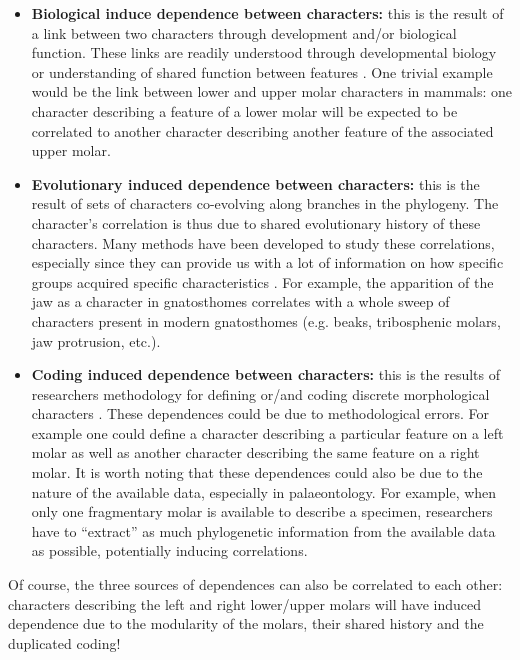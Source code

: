 \documentclass[12pt,letterpaper]{article}
\begin{document}
\begin{itemize}
    \item \textbf{Biological induce dependence between characters:} this is the result of a link between two characters through development and/or biological function.
    These links are readily understood through developmental biology or understanding of shared function between features \citep{goswami2006morphological,goswami2010,goswami2014macroevolutionary}.
    One trivial example would be the link between lower and upper molar characters in mammals: one character describing a feature of a lower molar will be expected to be correlated to another character describing another feature of the associated upper molar.

    \item \textbf{Evolutionary induced dependence between characters:} this is the result of sets of characters co-evolving along branches in the phylogeny.
    The character's correlation is thus due to shared evolutionary history of these characters.
    Many methods have been developed to study these correlations, especially since they can provide us with a lot of information on how specific groups acquired specific characteristics \citep{Lande1983,Maddison1990,Pagel1994,Pagel2006,Grabowski2016}.
    For example, the apparition of the jaw as a character in gnatosthomes correlates with a whole sweep of characters present in modern gnatosthomes (e.g. beaks, tribosphenic molars, jaw protrusion, etc.). %

    \item \textbf{Coding induced dependence between characters:} this is the results of researchers methodology for defining or/and coding discrete morphological characters \citep{Brazeau2011,simoes2017giant}.
    These dependences could be due to methodological errors. 
    For example one could define a character describing a particular feature on a left molar as well as another character describing the same feature on a right molar.
    It is worth noting that these dependences could also be due to the nature of the available data, especially in palaeontology.
    For example, when only one fragmentary molar is available to describe a specimen, researchers have to ``extract'' as much phylogenetic information from the available data as possible, potentially inducing correlations.
\end{itemize}

\noindent Of course, the three sources of dependences can also be correlated to each other: characters describing the left and right lower/upper molars will have induced dependence due to the modularity of the molars, their shared history and the duplicated coding!
\end{document}
